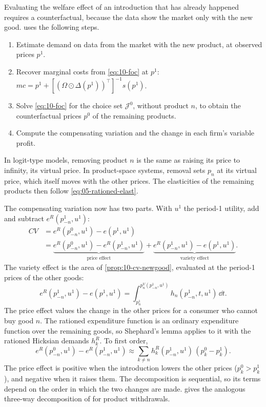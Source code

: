 Evaluating the welfare effect of an introduction that has already happened requires a counterfactual, because
the data show the market only with the new good. \citet[eqs.~1--3]{Petrin2002} uses the following steps.
\begin{enumerate}[label=(\roman*)]
  \item Estimate demand on data from the market with the new product, at observed prices $p^1$.
  \item Recover marginal costs from \eqref{eq:10-foc} at $p^1$: $mc = p^1 + [(\Omega\odot\Delta(p^1))^\top]^{-1}s(p^1)$.
  \item Solve \eqref{eq:10-foc} for the choice set $\mathcal{J}^0$, without product $n$, to obtain the
  counterfactual prices $p^0$ of the remaining products.
  \item Compute the compensating variation and the change in each firm's variable profit.
\end{enumerate}
In logit-type models, removing product $n$ is the same as raising its price to infinity, its virtual price. In
product-space systems, removal sets $p_n$ at its virtual price, which itself moves with the other prices.
The elasticities of the remaining products then follow \eqref{eq:05-rationed-elast}.

The compensating variation now has two parts. With $u^1$ the period-1 utility, add and subtract
$e^R(p_{-n}^1,u^1)$:
\begin{align}
  CV &= e^R(p_{-n}^0,u^1) - e(p^1,u^1) \nonumber\\
     &= \underbrace{e^R(p_{-n}^0,u^1) - e^R(p_{-n}^1,u^1)}_{\text{price effect}}
      + \underbrace{e^R(p_{-n}^1,u^1) - e(p^1,u^1)}_{\text{variety effect}} . \label{eq:10-cv-decomp}
\end{align}
The variety effect is the area of \cref{prop:10-cv-newgood}, evaluated at the period-1 prices of the other
goods:
\begin{equation*}
  e^R(p_{-n}^1,u^1) - e(p^1,u^1) = \int_{p_n^1}^{p_n^V(p_{-n}^1,u^1)}h_n(p_{-n}^1,t,u^1)\,\dd t .
\end{equation*}
The price effect values the change in the other prices for a consumer who cannot buy good $n$. The rationed
expenditure function is an ordinary expenditure function over the remaining goods, so Shephard's lemma
applies to it with the rationed Hicksian demands $h_k^R$. To first order,
\begin{equation}\label{eq:10-price-effect}
  e^R(p_{-n}^0,u^1) - e^R(p_{-n}^1,u^1) \approx \sum_{k\neq n}h_k^R(p_{-n}^1,u^1)\,(p_k^0 - p_k^1).
\end{equation}
The price effect is positive when the introduction lowers the other prices ($p_k^0 > p_k^1$), and negative when
it raises them. The decomposition is sequential, so its terms depend on the order in which the two changes
are made.  gives the analogous three-way decomposition of
\citet{ChaudhuriGoldbergJia2006} for product withdrawals.


